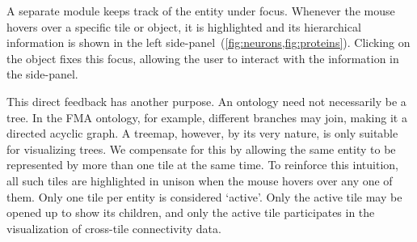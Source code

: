 
A separate module keeps track of the entity under focus. Whenever the mouse hovers
over a specific tile or object, it is highlighted and its hierarchical information
is shown in the left side-panel~(\cref{fig:neurons,fig:proteins}). Clicking on the object
fixes this focus, allowing the user to interact with the information in the side-panel.

This direct feedback has another purpose. An ontology need not necessarily be a
tree. In the FMA ontology, for example, different branches may join, making it a
directed acyclic graph. A treemap, however, by its very nature, is only suitable
for visualizing trees. We compensate for this by allowing the same entity to be
represented by more than one tile at the same time. To reinforce this intuition, all
such tiles are highlighted in unison when the mouse hovers over any one of them.
Only one tile per entity is considered `active'. Only the active tile may be opened
up to show its children, and only the active tile participates in the visualization
of cross-tile connectivity data.
